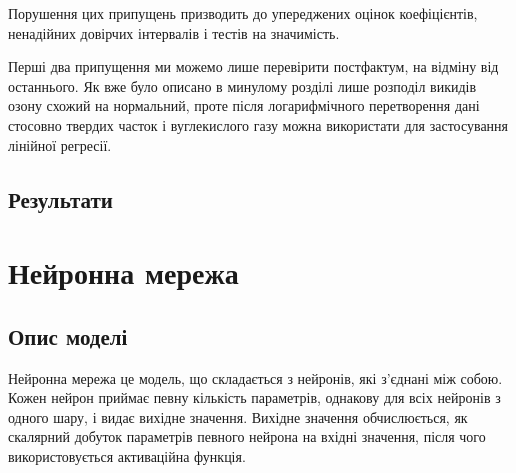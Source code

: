 Порушення цих припущень призводить до упереджених оцінок коефіцієнтів, ненадійних довірчих інтервалів і тестів на значимість.

Перші два припущення ми можемо лише перевірити постфактум, на відміну від останнього. 
Як вже було описано в минулому розділі лише розподіл викидів озону схожий на нормальний, проте після логарифмічного перетворення дані стосовно твердих часток і вуглекислого газу можна використати для застосування лінійної регресії.

\subsection{Результати}

\section{Нейронна мережа}

\subsection{Опис моделі}

Нейронна мережа це модель, що складається з нейронів, які з'єднані між собою. 
Кожен нейрон приймає певну кількість параметрів, однакову для всіх нейронів з одного шару, і видає вихідне значення. 
Вихідне значення обчислюється, як скалярний добуток параметрів певного нейрона на вхідні значення, після чого використовується активаційна функція. 

